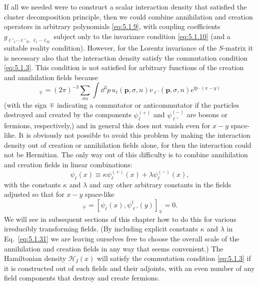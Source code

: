 If all we needed were to construct a scalar interaction density that
satisfied the cluster decomposition principle, then we could combine
annihilation and creation operators in arbitrary polynomials \eqref{eq:5.1.9}, with
coupling coefficients $g_{\ell'_1\cdots\ell'_N,\,\ell_1\cdots\ell_M}$ subject
only to the invariance condition \eqref{eq:5.1.10} (and a suitable reality condition).
However, for the Lorentz invariance of the $S$-matrix it is necessary also
that the interaction density satisfy the commutation condition \eqref{eq:5.1.3}.
This condition is not satisfied for arbitrary functions of the creation and
annihilation fields because
\begin{equation}
  [\psi^{(+)}_\ell(x),\psi^{(-)}_{\ell'}(y)]_\mp
  =(2\pi)^{-3}\sum_{\sigma n}\int \dd^3p\,
  u_\ell(\mathbf{p},\sigma,n)v_{\ell'}(\mathbf{p},\sigma,n)
  e^{\ii p\cdot(x-y)}
  \tag{5.1.30}\label{eq:5.1.30}
\end{equation}
(with the sign $\mp$ indicating a commutator or anticommutator if the particles
destroyed and created by the components $\psi^{(+)}_\ell$ and
$\psi^{(-)}_{\ell'}$ are bosons or fermions, respectively,) and in general this
does not vanish even for $x-y$ space-like. It is obviously not possible to
avoid this problem by making the interaction density out of creation or
annihilation fields alone, for then the interaction could not be Hermitian.
The only way out of this difficulty is to combine annihilation and creation
fields in linear combinations:
\begin{equation}
  \psi_\ell(x)\equiv\kappa\psi^{(+)}_\ell(x)
  +\lambda\psi^{(-)}_\ell(x),
  \tag{5.1.31}\label{eq:5.1.31}
\end{equation}
with the constants $\kappa$ and $\lambda$ and any other arbitrary constants
in the fields adjusted so that for $x-y$ space-like
\begin{equation}
  [\psi_\ell(x),\psi_{\ell'}(y)]_\mp
  =[\psi_\ell(x),\psi^\dagger_{\ell'}(y)]_\mp=0.
  \tag{5.1.32}\label{eq:5.1.32}
\end{equation}
We will see in subsequent sections of this chapter how to do this for various
irreducibly transforming fields. (By including explicit constants $\kappa$ and
$\lambda$ in Eq.~\eqref{eq:5.1.31} we are leaving ourselves free to choose the overall
scale of the annihilation and creation fields in any way that seems convenient.)
The Hamiltonian density $\mathcal{H}_I(x)$ will satisfy the commutation
condition \eqref{eq:5.1.3} if it is constructed out of such fields and their adjoints,
with an even number of any field components that destroy and create fermions.

